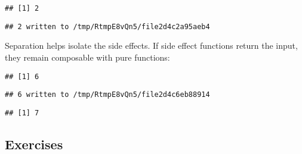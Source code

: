 \documentclass[]{book}
\newenvironment{Shaded}{\begin{snugshade}}{\end{snugshade}}
\newcommand{\DecValTok}[1]{\textcolor[rgb]{0.00,0.00,0.81}{#1}}
\newcommand{\KeywordTok}[1]{\textcolor[rgb]{0.13,0.29,0.53}{\textbf{#1}}}
\newcommand{\NormalTok}[1]{#1}
\newcommand{\OperatorTok}[1]{\textcolor[rgb]{0.81,0.36,0.00}{\textbf{#1}}}
\newcommand{\StringTok}[1]{\textcolor[rgb]{0.31,0.60,0.02}{#1}}
\begin{document}
\begin{verbatim}
## [1] 2
\end{verbatim}

\begin{verbatim}
## 2 written to /tmp/RtmpE8vQn5/file2d4c2a95aeb4
\end{verbatim}

Separation helps isolate the side effects.
If side effect functions return the input, they remain composable with pure functions:

\begin{Shaded}
\end{Shaded}

\begin{verbatim}
## [1] 6
\end{verbatim}

\begin{verbatim}
## 6 written to /tmp/RtmpE8vQn5/file2d4c6eb88914
\end{verbatim}

\begin{verbatim}
## [1] 7
\end{verbatim}

\hypertarget{exercises-17}{%
\subsection{Exercises}\label{exercises-17}}
\end{document}
